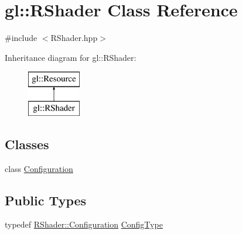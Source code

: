 \hypertarget{classgl_1_1_r_shader}{\section{gl\-:\-:R\-Shader Class Reference}
\label{classgl_1_1_r_shader}
}


{\ttfamily \#include $<$R\-Shader.\-hpp$>$}

Inheritance diagram for gl\-:\-:R\-Shader\-:\begin{figure}[H]
\begin{center}
\leavevmode
\includegraphics[height=2.000000cm]{classgl_1_1_r_shader}
\end{center}
\end{figure}
\subsection*{Classes}
\begin{DoxyCompactItemize}
\item 
class \hyperlink{classgl_1_1_r_shader_1_1_configuration}{Configuration}
\end{DoxyCompactItemize}
\subsection*{Public Types}
\begin{DoxyCompactItemize}
\item 
typedef \hyperlink{classgl_1_1_r_shader_1_1_configuration}{R\-Shader\-::\-Configuration} \hyperlink{classgl_1_1_r_shader_a737d7ce7dc0057760c6ff971aebdb3ff}{Config\-Type}
\end{DoxyCompactItemize}
